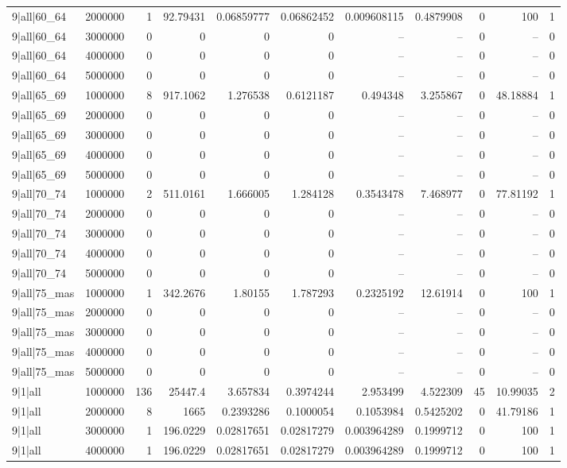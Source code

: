 \begin{tabular}{lrrrrrrrrrr}
9|all|60\_64 & 2000000 & 1 & 92.79431 & 0.06859777 & 0.06862452 & 0.009608115 & 0.4879908 & 0 & 100 & 1 \\
9|all|60\_64 & 3000000 & 0 & 0 & 0 & 0 & -- & -- & 0 & -- & 0 \\
9|all|60\_64 & 4000000 & 0 & 0 & 0 & 0 & -- & -- & 0 & -- & 0 \\
9|all|60\_64 & 5000000 & 0 & 0 & 0 & 0 & -- & -- & 0 & -- & 0 \\
9|all|65\_69 & 1000000 & 8 & 917.1062 & 1.276538 & 0.6121187 & 0.494348 & 3.255867 & 0 & 48.18884 & 1 \\
9|all|65\_69 & 2000000 & 0 & 0 & 0 & 0 & -- & -- & 0 & -- & 0 \\
9|all|65\_69 & 3000000 & 0 & 0 & 0 & 0 & -- & -- & 0 & -- & 0 \\
9|all|65\_69 & 4000000 & 0 & 0 & 0 & 0 & -- & -- & 0 & -- & 0 \\
9|all|65\_69 & 5000000 & 0 & 0 & 0 & 0 & -- & -- & 0 & -- & 0 \\
9|all|70\_74 & 1000000 & 2 & 511.0161 & 1.666005 & 1.284128 & 0.3543478 & 7.468977 & 0 & 77.81192 & 1 \\
9|all|70\_74 & 2000000 & 0 & 0 & 0 & 0 & -- & -- & 0 & -- & 0 \\
9|all|70\_74 & 3000000 & 0 & 0 & 0 & 0 & -- & -- & 0 & -- & 0 \\
9|all|70\_74 & 4000000 & 0 & 0 & 0 & 0 & -- & -- & 0 & -- & 0 \\
9|all|70\_74 & 5000000 & 0 & 0 & 0 & 0 & -- & -- & 0 & -- & 0 \\
9|all|75\_mas & 1000000 & 1 & 342.2676 & 1.80155 & 1.787293 & 0.2325192 & 12.61914 & 0 & 100 & 1 \\
9|all|75\_mas & 2000000 & 0 & 0 & 0 & 0 & -- & -- & 0 & -- & 0 \\
9|all|75\_mas & 3000000 & 0 & 0 & 0 & 0 & -- & -- & 0 & -- & 0 \\
9|all|75\_mas & 4000000 & 0 & 0 & 0 & 0 & -- & -- & 0 & -- & 0 \\
9|all|75\_mas & 5000000 & 0 & 0 & 0 & 0 & -- & -- & 0 & -- & 0 \\
9|1|all & 1000000 & 136 & 25447.4 & 3.657834 & 0.3974244 & 2.953499 & 4.522309 & 45 & 10.99035 & 2 \\
9|1|all & 2000000 & 8 & 1665 & 0.2393286 & 0.1000054 & 0.1053984 & 0.5425202 & 0 & 41.79186 & 1 \\
9|1|all & 3000000 & 1 & 196.0229 & 0.02817651 & 0.02817279 & 0.003964289 & 0.1999712 & 0 & 100 & 1 \\
9|1|all & 4000000 & 1 & 196.0229 & 0.02817651 & 0.02817279 & 0.003964289 & 0.1999712 & 0 & 100 & 1 \\

\end{tabular}
